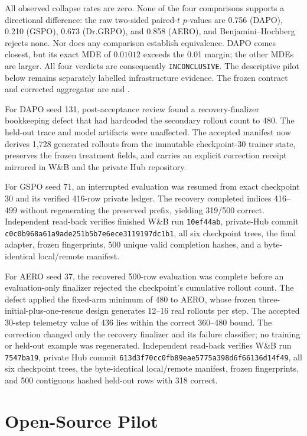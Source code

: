 \documentclass[11pt]{article}
\newcommand{\grpo}{\textsc{GRPO}}
\newcommand{\AuditDAPOMDE}{0.01012}
\begin{document}
All observed collapse rates are zero. None of the four comparisons supports a
directional difference: the raw two-sided paired-$t$ $p$-values are 0.756
(DAPO), 0.210 (GSPO), 0.673 (Dr.\grpo{}), and 0.858 (AERO), and
Benjamini--Hochberg rejects none. Nor does any comparison establish
equivalence. DAPO comes closest, but its exact MDE of $\AuditDAPOMDE$ exceeds
the 0.01 margin; the other MDEs are larger. All four verdicts are consequently
\texttt{INCONCLUSIVE}. The descriptive pilot below remains separately labelled
infrastructure evidence. The frozen contract and corrected aggregator are
 and
.

For DAPO seed 131, post-acceptance review found a recovery-finalizer
bookkeeping defect that had hardcoded the secondary rollout count to 480. The
held-out trace and model artifacts were unaffected. The accepted manifest now
derives 1,728 generated rollouts from the immutable checkpoint-30 trainer state,
preserves the frozen treatment fields, and carries an explicit correction
receipt mirrored in W\&B and the private Hub repository.

For GSPO seed 71, an interrupted evaluation was resumed from exact checkpoint
30 and its verified 416-row private ledger. The recovery completed indices
416--499 without regenerating the preserved prefix, yielding 319/500 correct.
Independent read-back verifies finished W\&B run \texttt{10ef44ab}, private-Hub
commit \texttt{c0c0b968a61a9ade251b5b7e6ece3119197dc1b1}, all six checkpoint
trees, the final adapter, frozen fingerprints, 500 unique valid completion
hashes, and a byte-identical local/remote manifest.

For AERO seed 37, the recovered 500-row evaluation was complete before an
evaluation-only finalizer rejected the checkpoint's cumulative rollout count.
The defect applied the fixed-arm minimum of 480 to AERO, whose frozen
three-initial-plus-one-rescue design generates 12--16 real rollouts per step.
The accepted 30-step telemetry value of 436 lies within the correct 360--480
bound. The correction changed only the recovery finalizer and its failure
classifier; no training or held-out example was regenerated. Independent
read-back verifies W\&B run \texttt{7547ba19}, private Hub commit
\texttt{613d3f70cc0fb89eae5775a398d6f66136d14f49}, all six checkpoint trees,
the byte-identical local/remote manifest, frozen fingerprints, and 500
contiguous hashed held-out rows with 318 correct.

\section{Open-Source Pilot}
\label{sec:pilot}
\end{document}
